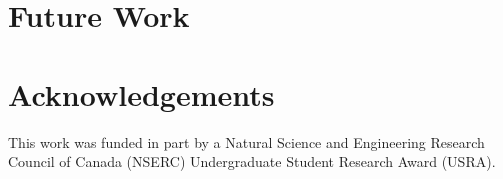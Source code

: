 \documentclass{sig-alternate}
\begin{document}

\section{Future Work}

\section{Acknowledgements}
This work was funded in part by a Natural Science and Engineering Research Council of Canada (NSERC) Undergraduate Student Research Award (USRA).

  
  
  
  
   


%

\setlength{\bibsep}{0.5ex}





%
\end{document}
